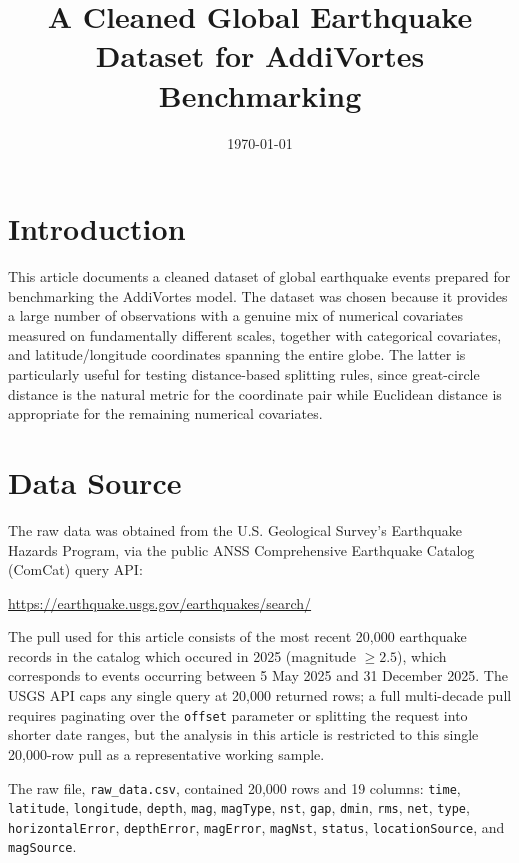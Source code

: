 \documentclass[11pt]{article}
\title{A Cleaned Global Earthquake Dataset for AddiVortes Benchmarking}
\author{}
\date{\today}
\begin{document}
\maketitle

\section{Introduction}

This article documents a cleaned dataset of global earthquake events prepared for
benchmarking the AddiVortes model. The dataset was chosen because it provides a
large number of observations with a genuine mix of numerical covariates measured
on fundamentally different scales, together with categorical covariates, and
latitude/longitude coordinates spanning the entire globe. The latter is
particularly useful for testing distance-based splitting rules, since great-circle
distance is the natural metric for the coordinate pair while Euclidean distance
is appropriate for the remaining numerical covariates.

\section{Data Source}

The raw data was obtained from the U.S. Geological Survey's Earthquake Hazards
Program, via the public ANSS Comprehensive Earthquake Catalog (ComCat) query API:

\begin{center}
\url{https://earthquake.usgs.gov/earthquakes/search/}
\end{center}

The pull used for this article consists of the most recent 20{,}000 earthquake
records in the catalog which occured in 2025 (magnitude $\geq 2.5$), which
corresponds to events occurring between 5 May 2025 and 31 December 2025. The USGS
API caps any single query at 20{,}000 returned rows; a full multi-decade pull
requires paginating over the \texttt{offset} parameter or splitting the request
into shorter date ranges, but the analysis in this article is restricted to this
single 20{,}000-row pull as a representative working sample.

The raw file, \texttt{raw\_data.csv}, contained 20{,}000 rows and 19 columns:
\texttt{time}, \texttt{latitude}, \texttt{longitude}, \texttt{depth}, \texttt{mag},
\texttt{magType}, \texttt{nst}, \texttt{gap}, \texttt{dmin}, \texttt{rms},
\texttt{net}, \texttt{type}, \texttt{horizontalError}, \texttt{depthError},
\texttt{magError}, \texttt{magNst}, \texttt{status}, \texttt{locationSource}, and
\texttt{magSource}.
\end{document}
